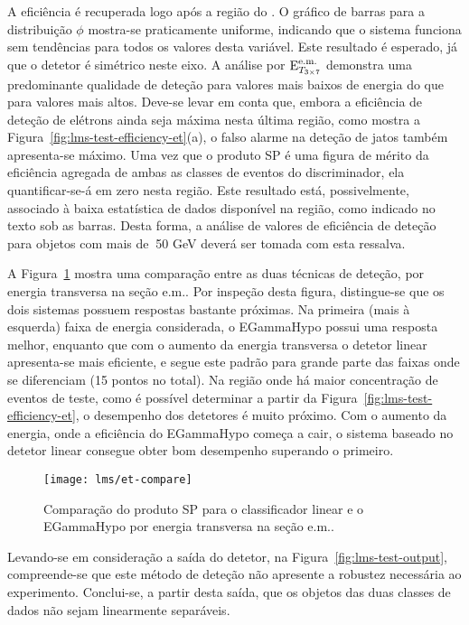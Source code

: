 A eficiência é recuperada logo após a região do . O gráfico de
barras para a distribuição $\phi$ mostra-se praticamente uniforme, indicando
que o sistema funciona sem tendências para todos os valores desta
variável. Este resultado é esperado, já que o detetor é simétrico neste
eixo. A análise por $\text{E}^{\text{e.m.}}_{T_{3\times7}}$ demonstra uma predominante qualidade de deteção
para valores mais baixos de energia do que para valores mais altos. Deve-se
levar em conta que, embora a eficiência de deteção de elétrons ainda seja
máxima nesta última região, como mostra a
Figura~\ref{fig:lms-test-efficiency-et}(a), o falso alarme na deteção de jatos
também apresenta-se máximo. Uma vez que o produto SP é uma figura de mérito da
eficiência agregada de ambas as classes de eventos do discriminador, ela
quantificar-se-á em zero nesta região. Este resultado está, possivelmente,
associado à baixa estatística de dados disponível na região, como indicado no
texto sob as barras. Desta forma, a análise de valores de eficiência de
deteção para objetos com mais de $~$50 GeV deverá ser tomada com esta
ressalva.

A Figura~\ref{fig:lms-vs-egamma} mostra uma comparação entre as duas técnicas
de deteção, por energia transversa na seção e.m.. Por inspeção desta figura,
distingue-se que os dois sistemas possuem respostas bastante próximas. Na
primeira (mais à esquerda) faixa de energia considerada, o EGammaHypo possui
uma resposta melhor, enquanto que com o aumento da energia transversa o detetor
linear apresenta-se mais eficiente, e segue este padrão para grande parte das
faixas onde se diferenciam (15 pontos no total). Na região onde há maior
concentração de eventos de teste, como é possível determinar a partir da
Figura~\ref{fig:lms-test-efficiency-et}, o desempenho dos detetores é muito
próximo. Com o aumento da energia, onde a eficiência do EGammaHypo começa a
cair, o sistema baseado no detetor linear consegue obter bom desempenho
superando o primeiro.

\begin{figure}
\begin{center}
\texttt{[image: lms/et-compare]}
\end{center}
\caption{Comparação do produto SP para o classificador linear e o
EGammaHypo por energia transversa na seção e.m..}
\label{fig:lms-vs-egamma}
\end{figure}

Levando-se em consideração a saída do detetor, na
Figura~\ref{fig:lms-test-output}, compreende-se que este método de deteção não
apresente a robustez necessária ao experimento. Conclui-se, a partir desta
saída, que os objetos das duas classes de dados não sejam linearmente
separáveis.

